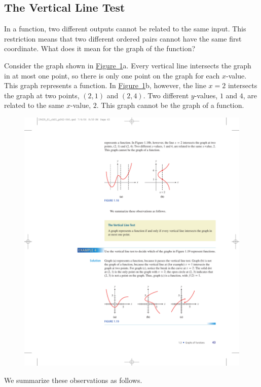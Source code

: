 \documentclass[10pt,]{book}
\theoremstyle{plain}
\theoremstyle{definition}
\theoremstyle{definition}
\theoremstyle{definition}
\theoremstyle{definition}
\numberwithin{equation}{part}
\begin{document}
\subsection[{The Vertical Line Test}]{The Vertical Line Test}\label{subsection-17}
In a function, two different outputs cannot be related to the same input. This restriction means that two different ordered pairs cannot have the same first coordinate. What does it mean for the graph of the function?%
\par
Consider the graph shown in \hyperref[fig-vertical-line-test]{Figure~\ref{fig-vertical-line-test}}a. Every vertical line intersects the graph in at most one point, so there is only one point on the graph for each \(x\)-value. This graph represents a function. In \hyperref[fig-vertical-line-test]{Figure~\ref{fig-vertical-line-test}}b, however, the line \(x = 2\) intersects the graph at two points, \((2, 1)\) and \((2, 4)\). Two different \(y\)-values, \(1\) and \(4\), are related to the same \(x\)-value, \(2\). This graph cannot be the graph of a function.%
\begin{figure}
\centering
\includegraphics[width=0.9\linewidth]{images/fig-vertical-line-test}
\caption{\label{fig-vertical-line-test}}
\end{figure}
We summarize these observations as follows.%
\end{document}

